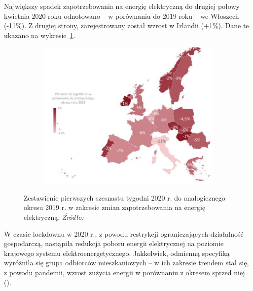 \documentclass[polish, twoside, 12pt, a4paper]{article}
\theoremstyle{definition}
\theoremstyle{plain}
\theoremstyle{remark}
\begin{document}
Największy spadek zapotrzebowania na energię elektryczną do drugiej połowy kwietnia 2020 roku odnotowano – w porównaniu do 2019 roku – we Włoszech (-11\%). Z drugiej strony, zarejestrowany został wzrost w Irlandii (+1\%). Dane te ukazano na wykresie~\ref{fig:x6}. 

\begin{figure}[hbt]
  \centering

  \begin{subfigure}[t]{0.45\textwidth}
    \includegraphics[width=\textwidth]{./figure_6}
  \end{subfigure}

  \captionsetup{margin=10pt,font=small,labelfont=bf,width=.8\textwidth}

  \caption[Zmiany zapotrzebowania na energię elektryczną (16 tygodni)]{Zestawienie pierwszych szesnastu tygodni 2020 r. do analogicznego okresu 2019 r. w zakresie zmian zapotrzebowania na energię elektryczną. \textit{Źródło:} \cite{biuroanalizpfr2020}}\label{fig:x6}
\end{figure}

W czasie lockdownu w 2020 r., z powodu restrykcji ograniczających działalność gospodarczą, nastąpiła redukcja poboru energii elektrycznej na poziomie krajowego systemu elektroenergetycznego. Jakkolwiek, odmienną specyfiką wyróżniła się grupa odbiorców mieszkaniowych – w ich zakresie trendem stał się, z powodu pandemii, wzrost zużycia energii w porównaniu z okresem sprzed niej (\cite{artsmart2023}). 
\end{document}
